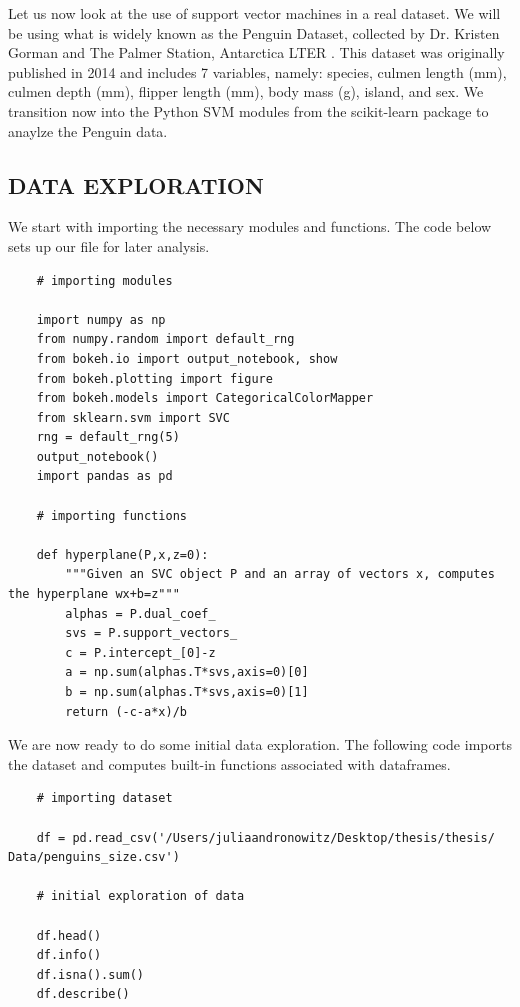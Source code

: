 \documentclass[12pt]{article}
\begin{document}
Let us now look at the use of support vector machines in a real dataset. We will be using what is widely known as the Penguin Dataset, collected by Dr. Kristen Gorman and The Palmer Station, Antarctica LTER \cite{penguin_data}. This dataset was originally published in 2014 and includes 7 variables, namely: species, culmen length (mm), culmen depth (mm), flipper length (mm), body mass (g), island, and sex. We transition now into the Python SVM modules from the scikit-learn package to anaylze the Penguin data.

\subsection{DATA EXPLORATION}

We start with importing the necessary modules and functions. The code below sets up our file for later analysis.

\begin{verbatim}
    # importing modules
    
    import numpy as np
    from numpy.random import default_rng
    from bokeh.io import output_notebook, show
    from bokeh.plotting import figure
    from bokeh.models import CategoricalColorMapper
    from sklearn.svm import SVC
    rng = default_rng(5)
    output_notebook()
    import pandas as pd

    # importing functions

    def hyperplane(P,x,z=0):
        """Given an SVC object P and an array of vectors x, computes the hyperplane wx+b=z"""
        alphas = P.dual_coef_
        svs = P.support_vectors_
        c = P.intercept_[0]-z
        a = np.sum(alphas.T*svs,axis=0)[0]
        b = np.sum(alphas.T*svs,axis=0)[1]
        return (-c-a*x)/b
\end{verbatim}

We are now ready to do some initial data exploration. The following code imports the dataset and computes built-in functions associated with dataframes.

\begin{verbatim}
    # importing dataset

    df = pd.read_csv('/Users/juliaandronowitz/Desktop/thesis/thesis/ Data/penguins_size.csv')

    # initial exploration of data

    df.head()
    df.info()
    df.isna().sum()
    df.describe()
\end{verbatim}
\end{document}
